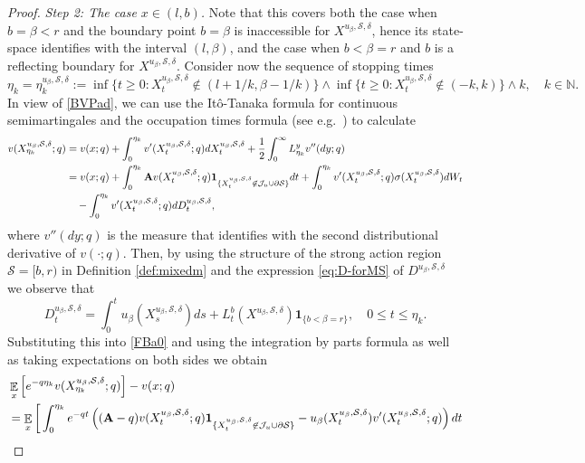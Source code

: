 \documentclass[11pt]{article} %
\def\N{\mathbb{N}}
\DeclareMathOperator{\E}{\mathbb E}
\numberwithin{komcounter}{section}
\begin{document}
\begin{proof}
\vspace{1mm}
{\it Step 2: The case $x\in (l,b)$.} 
Note that this covers both the case when $b=\beta<r$ and the boundary point $b=\beta$ is inaccessible for $X^{u_\beta,\mathcal{S},\delta}$, hence its state-space identifies with the interval $(l,\beta)$, and the case when $b<\beta= r$ and $b$ is a reflecting boundary for $X^{u_\beta,\mathcal{S},\delta}$.   
Consider now the sequence of stopping times 
$$
\eta_k = \eta_k^{u_\beta,\mathcal{S},\delta} 
:= \inf \big\{t\geq 0: X^{u_\beta,\mathcal{S},\delta}_t \not\in (l+1/k, \beta-1/k) \big\} \wedge \inf \big\{ t\geq 0: X^{u_\beta,\mathcal{S},\delta}_t \not\in (-k,k) \big\} \wedge k, \quad k\in\N.
$$ 
In view of \eqref{BVPad}, we can use the It\^{o}-Tanaka formula for continuous semimartingales and the occupation times formula (see e.g.~\cite[Chapter VI, Exercise 1.25, Corollary 1.6]{revuz2013continuous}) to calculate 
\begin{align} \label{FBa0}
v(X^{u_\beta,\mathcal{S},\delta}_{\eta_k}; q) 
&= v(x;q) + \int_0^{\eta_k } v'(X^{u_\beta,\mathcal{S},\delta}_{t};q) dX^{u_\beta,\mathcal{S},\delta}_t + \frac12 \int_0^{\infty} L^y_{\eta_k} v''(dy;q) \notag\\
&= v(x;q) + \int_0^{\eta_k } \textbf{A} v(X^{u_\beta,\mathcal{S},\delta}_t;q) {\bf 1}_{\{X^{u_\beta,\mathcal{S},\delta}_t\not\in \mathcal{J}_u\cup \partial\mathcal{S}\}} dt + \int_0^{\eta_k} v'(X^{u_\beta,\mathcal{S},\delta}_{t};q)\sigma(X^{u_\beta,\mathcal{S},\delta}_t) dW_t \notag\\
&\quad - \int_0^{\eta_k} v'(X^{u_\beta,\mathcal{S},\delta}_{t};q) dD^{u_\beta,\mathcal{S},\delta}_t ,
\end{align}
where $v''(dy;q)$ is the measure that identifies with the second distributional derivative of $v(\cdot;q)$. 
Then, by using the structure of the strong action region $\mathcal{S}=[b,r)$ in Definition \ref{def:mixedm} and the expression \eqref{eq:D-forMS} of $D^{u_\beta,\mathcal{S},\delta}$ we observe that 
$$
D^{u_\beta,\mathcal{S},\delta}_t = \int_{0}^{t} u_\beta(X_s^{u_\beta,\mathcal{S},\delta}) ds + L^{b}_t(X^{u_\beta,\mathcal{S},\delta}) \mathbf{1}_{\{b < \beta = r\}}, \quad 0 \leq t \leq \eta_k. 
$$
Substituting this into \eqref{FBa0} and using the integration by parts formula as well as taking expectations on both sides we obtain 
\begin{align*} 
&\E_x\left[e^{- q \eta_k} v(X^{u_\beta,\mathcal{S},\delta}_{\eta_k};q) \right] - v(x;q) \notag\\
&= \E_x\bigg[\int_0^{\eta_k } e^{-qt} \left( (\textbf{A} - q) v(X^{u_\beta,\mathcal{S},\delta}_t;q) {\bf 1}_{\{X^{u_\beta,\mathcal{S},\delta}_t\not\in \mathcal{J}_u\cup \partial\mathcal{S}\}}  - u_\beta(X^{u_\beta,\mathcal{S},\delta}_t) v'(X^{u_\beta,\mathcal{S},\delta}_{t};q) \right) dt \notag\\

\end{align*}
\end{proof}
\end{document}
